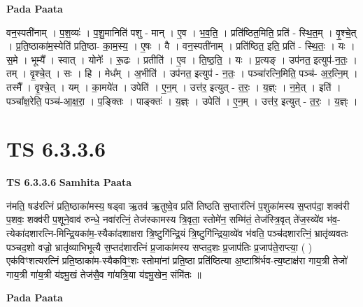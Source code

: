 \documentclass[17pt]{extarticle}
\begin{document}
\textbf{Pada Paata} \newline

वन॒स्पती॑नाम् । प॒श॒व्यः॑ । प॒शु॒मानिति॑ पशु - मान् । ए॒व । भ॒व॒ति॒ । प्रति॑ष्ठित॒मिति॒ प्रति॑ - स्थि॒त॒म् । वृ॒श्चे॒त् । प्र॒ति॒ष्ठाका॑म॒स्येति॑ प्रति॒ष्ठा- का॒म॒स्य॒ । ए॒षः । वै । वन॒स्पती॑नाम् । प्रति॑ष्ठित॒ इति॒ प्रति॑ - स्थि॒तः॒ । यः । स॒मे । भूम्यै᳚ । स्वात् । योनेः᳚ । रू॒ढः । प्रतीति॑ । ए॒व । ति॒ष्ठ॒ति॒ । यः । प्र॒त्यङ् । उप॑नत॒ इत्युप॑-न॒तः॒ । तम् । वृ॒श्चे॒त् । सः । हि । मेध᳚म् । अ॒भीति॑ । उप॑नत॒ इत्युप॑ - न॒तः॒ । पञ्चा॑रत्नि॒मिति॒ पञ्च॑- अ॒र॒त्नि॒म् । तस्मै᳚ । वृ॒श्चे॒त् । यम् । का॒मये॑त । उपेति॑ । ए॒न॒म् । उत्त॑र॒ इत्युत् - त॒रः॒ । य॒ज्ञ्ः । न॒मे॒त् । इति॑ । पञ्चा᳚क्ष॒रेति॒ पञ्च॑-आ॒क्ष॒रा॒ । प॒ङ्क्तिः । पाङ्क्तः॑ । य॒ज्ञ्ः । उपेति॑ । ए॒न॒म् । उत्त॑र॒ इत्युत् - त॒रः॒ । य॒ज्ञ्ः ।  \newline





\section{ TS 6.3.3.6 }

\textbf{TS 6.3.3.6 } \newline
\textbf{Samhita Paata} \newline

न॑मति॒ षड॑रत्निं प्रति॒ष्ठाका॑मस्य॒ षड्वा ऋ॒तव॑ ऋ॒तुष्वे॒व प्रति॑ तिष्ठति स॒प्तार॑त्निं प॒शुका॑मस्य स॒प्तप॑दा॒ शक्व॑री प॒शवः॒ शक्व॑री प॒शूने॒वाव॑ रुन्धे॒ नवा॑रत्निं॒ तेज॑स्कामस्य त्रि॒वृता॒ स्तोमे॑न॒ सम्मि॑तं॒ तेज॑स्त्रि॒वृत् ते॑ज॒स्व्ये॑व भ॑व॒-त्येका॑दशारत्नि-मिन्द्रि॒यका॑म॒-स्यैका॑दशाक्षरा त्रि॒ष्टुगि॑न्द्रि॒यं त्रि॒ष्टुगि॑न्द्रिया॒व्ये॑व भ॑वति॒ पञ्च॑दशारत्निं॒ भ्रातृ॑व्यवतः पञ्चद॒शो वज्रो॒ भ्रातृ॑व्याभिभूत्यै स॒प्तद॑शारत्निं प्र॒जाका॑मस्य सप्तद॒शः प्र॒जाप॑तिः प्र॒जाप॑ते॒राप्त्या॒ ( ) एक॑विꣳशत्यरत्निं प्रति॒ष्ठाका॑म-स्यैकविꣳ॒॒शः स्तोमा॑नां प्रति॒ष्ठा प्रति॑ष्ठित्या अ॒ष्टाश्रि॑र्भव-त्य॒ष्टाक्ष॑रा गाय॒त्री तेजो॑ गाय॒त्री गा॑य॒त्री य॑ज्ञ्मु॒खं तेज॑सै॒व गा॑यत्रि॒या य॑ज्ञ्मु॒खेन॒ संमि॑तः ॥ \newline

\textbf{Pada Paata} \newline
\end{document}
